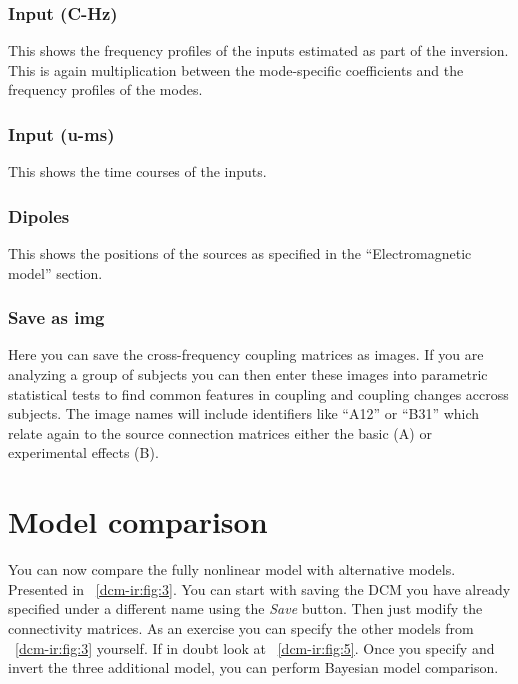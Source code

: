 \subsubsection{Input (C-Hz)}
This shows the frequency profiles of the inputs estimated as part of the inversion. This is again multiplication between the mode-specific coefficients and the frequency profiles of the modes. 

\subsubsection{Input (u-ms)}
This shows the time courses of the inputs.

\subsubsection{Dipoles}
This shows the positions of the sources as specified in the ``Electromagnetic model'' section.

\subsubsection{Save as img}
Here you can save the cross-frequency coupling matrices as images. If you are analyzing a group of subjects you can then enter these images into parametric statistical tests to find common features in coupling and coupling changes accross subjects. The image names will include identifiers like ``A12'' or ``B31'' which relate again to the source connection matrices either the basic (A) or experimental effects (B).

\section{Model comparison}

You can now compare the fully nonlinear model with alternative models. Presented in  ~\ref{dcm-ir:fig:3}. You can start with saving the DCM you have already specified under a different name using the \textit{Save} button. Then just modify the connectivity matrices. As an exercise you can specify the other models from ~\ref{dcm-ir:fig:3} yourself. If in doubt look at ~\ref{dcm-ir:fig:5}. Once you specify and invert the three additional model, you can perform Bayesian model comparison. 

